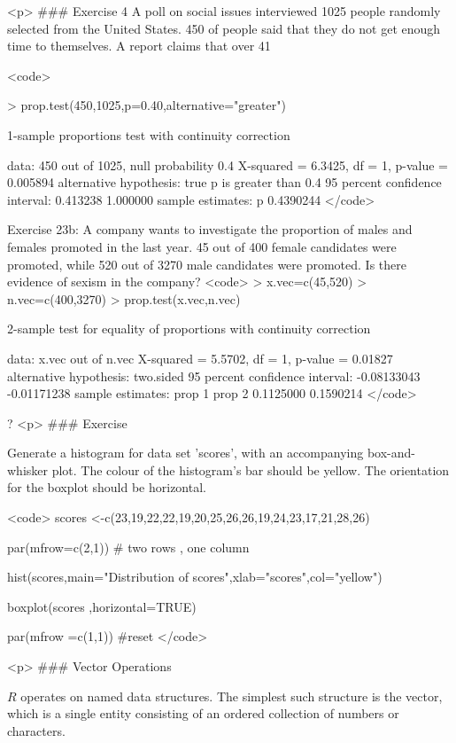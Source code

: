 <p>
### {Exercise 4}
A poll on social issues interviewed 1025 people randomly selected from the United States. 450 of people said that they do not get enough time to themselves. A report claims that over 41%

<code>

> prop.test(450,1025,p=0.40,alternative="greater")

 1-sample proportions test with continuity correction

data:  450 out of 1025, null probability 0.4
X-squared = 6.3425, df = 1, p-value = 0.005894
alternative hypothesis: true p is greater than 0.4
95 percent confidence interval:
 0.413238 1.000000
sample estimates:
 p
0.4390244
</code>

Exercise 23b:  A company wants to investigate the proportion of males and females promoted in the last year. 45 out of 400 female candidates were promoted, while 520 out of 3270 male candidates were promoted. Is there evidence of sexism in the company?
<code>
> x.vec=c(45,520)
> n.vec=c(400,3270)
>  prop.test(x.vec,n.vec)

 2-sample test for equality of proportions with continuity correction

data:  x.vec out of n.vec
X-squared = 5.5702, df = 1, p-value = 0.01827
alternative hypothesis: two.sided
95 percent confidence interval:
 -0.08133043 -0.01171238
sample estimates:
   prop 1    prop 2
0.1125000 0.1590214
</code>

?
<p>
### {Exercise}

Generate a histogram for data set 'scores', with an accompanying box-and-whisker plot.
The colour of the histogram's bar should be yellow. The orientation for the boxplot should be horizontal.

<code>
scores <-c(23,19,22,22,19,20,25,26,26,19,24,23,17,21,28,26)

par(mfrow=c(2,1)) 	# two rows , one column

hist(scores,main="Distribution of scores",xlab="scores",col="yellow")

boxplot(scores ,horizontal=TRUE)

par(mfrow =c(1,1)) 	#reset
</code>

<p>
### {Vector Operations}

$R$ operates on named data structures. The simplest such
structure is the vector, which is a single entity consisting of an
ordered collection of numbers or characters.

